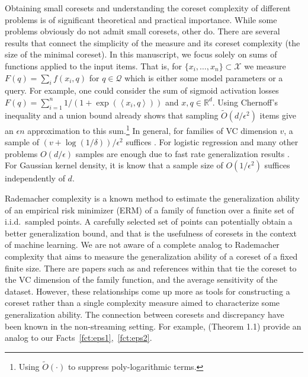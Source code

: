 \documentclass[anon,12pt]{colt2019} %
\newcommand{\ip}[1]{\left \langle #1 \right \rangle}
\newcommand{\R}{\mathbb{R}}
\newcommand{\eps}{\epsilon}
\newcommand{\X}{\mathcal{X}}
\newcommand{\Q}{\mathcal{Q}}
\begin{document}
Obtaining small coresets and understanding the coreset complexity of different problems is of significant theoretical and practical importance.
While some problems obviously do not admit small coresets, other do. 
There are several results that connect the simplicity of the measure and its coreset complexity (the size of the minimal coreset).
In this manuscript, we focus solely on sums of functions applied to the input items.
That is, for $\{x_i,\ldots,x_n\} \subset \X$ we measure $F(q) = \sum_i f(x_i,q)$ for $q \in \Q$ which is either some model parameters or a query.
For example, one could consider the sum of sigmoid activation losses $F(q) = \sum_{i=1}^{n} 1/(1+ \exp(\ip{x_i,q}))$ and $x,q\in \R^d$.
Using Chernoff's inequality and a union bound already shows that sampling $\tilde O(d/\eps^2)$ items give an $\eps n$ approximation to this sum.\footnote{Using $\tilde O(\cdot)$ to suppress poly-logarithmic terms.} 
In general, for families of VC dimension $v$, a sample of $(v+\log(1/\delta))/\eps^2$ suffices \cite{talagrand1994sharper}.
For logistic regression and many other problems $O(d/\eps)$ samples are enough due to fast rate generalization results \cite{van2015fast}.
For Gaussian kernel density, it is know that a sample size of $O(1/\eps^2)$ suffices independently of $d$.

Rademacher complexity \cite{Bartlett:2003:RGC:944919.944944} is a known method to estimate the generalization ability of an empirical risk minimizer (ERM) of a family of function over a finite set of i.i.d.\ sampled points. A carefully selected set of points can potentially obtain a better generalization bound, and that is the usefulness of coresets in the context of machine learning. We are not aware of a complete analog to Rademacher complexity that aims to measure the generalization ability of a coreset of a fixed finite size. There are papers such as \cite{langberg2010universal, tolochinsky2018coresets} and references within that tie the coreset to the VC dimension of the family function, and the average sensitivity of the dataset. However, these relationships come up more as tools for constructing a coreset rather than a single complexity measure aimed to characterize some generalization ability. The connection between coresets and discrepancy have been known in the non-streaming setting. For example, \cite{phillips2009small} (Theorem 1.1) provide an analog to our Facts~\ref{fct:eps1},~\ref{fct:eps2}.
\end{document}

